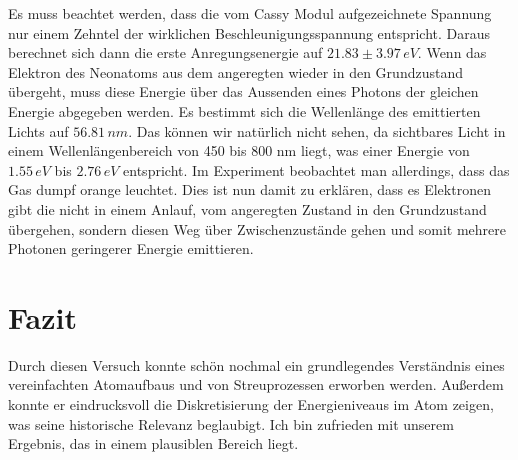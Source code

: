 \documentclass[a4paper, 12pt]{scrartcl}
\begin{document}
Es muss beachtet werden, dass die vom Cassy Modul aufgezeichnete Spannung nur einem Zehntel der wirklichen Beschleunigungsspannung entspricht. Daraus berechnet sich dann die erste Anregungsenergie auf $21.83\pm3.97\,eV$. Wenn das Elektron des Neonatoms aus dem angeregten wieder in den Grundzustand übergeht, muss diese Energie über das Aussenden eines Photons der gleichen Energie abgegeben werden. Es bestimmt sich die Wellenlänge des emittierten Lichts auf $56.81\,nm$. Das können wir natürlich nicht sehen, da sichtbares Licht in einem Wellenlängenbereich von 450 bis 800 nm liegt, was einer Energie von $1.55\,eV$ bis $2.76\,eV$ entspricht. Im Experiment beobachtet man allerdings, dass das Gas dumpf orange leuchtet. Dies ist nun damit zu erklären, dass es Elektronen gibt die nicht in einem Anlauf, vom angeregten Zustand in den Grundzustand übergehen, sondern diesen Weg über Zwischenzustände gehen und somit mehrere Photonen geringerer Energie emittieren.

\section{Fazit}
Durch diesen Versuch konnte schön nochmal ein grundlegendes Verständnis eines vereinfachten Atomaufbaus und von Streuprozessen erworben werden. Außerdem konnte er eindrucksvoll die Diskretisierung der Energieniveaus im Atom zeigen, was seine historische Relevanz beglaubigt. Ich bin zufrieden mit unserem Ergebnis, das in einem plausiblen Bereich liegt.
\end{document}
